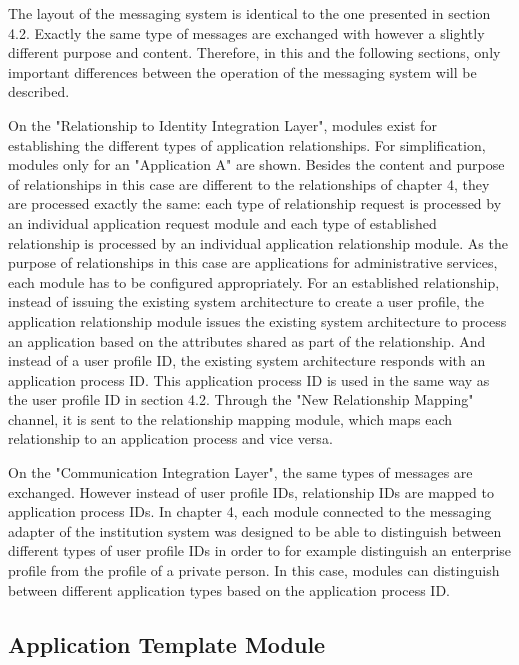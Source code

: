 The layout of the messaging system is identical to the one presented in section 4.2. Exactly the same type of messages are exchanged with however a slightly different purpose and content. Therefore, in this and the following sections, only important differences between the operation of the messaging system will be described.

On the "Relationship to Identity Integration Layer", modules exist for establishing the different types of application relationships. For simplification, modules only for an "Application A" are shown. Besides the content and purpose of relationships in this case are different to the relationships of chapter 4, they are processed exactly the same: each type of relationship request is processed by an individual application request module and each type of established relationship is processed by an individual application relationship module. As the purpose of relationships in this case are applications for administrative services, each module has to be configured appropriately. For an established relationship, instead of issuing the existing system architecture to create a user profile, the application relationship module issues the existing system architecture to process an application based on the attributes shared as part of the relationship. And instead of a user profile ID, the existing system architecture responds with an application process ID. This application process ID is used in the same way as the user profile ID in section 4.2. Through the "New Relationship Mapping" channel, it is sent to the relationship mapping module, which maps each relationship to an application process and vice versa.

On the "Communication Integration Layer", the same types of messages are exchanged. However instead of user profile IDs, relationship IDs are mapped to application process IDs. In chapter 4, each module connected to the messaging adapter of the institution system was designed to be able to distinguish between different types of user profile IDs in order to for example distinguish an enterprise profile from the profile of a private person. In this case, modules can distinguish between different application types based on the application process ID.

\subsection{Application Template Module}

